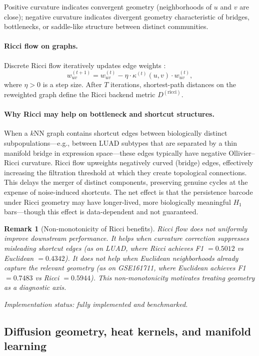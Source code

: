 \documentclass[11pt]{article}
\newtheorem{remark}[theorem]{Remark}
\begin{document}
Positive curvature indicates convergent geometry (neighborhoods of $u$ and $v$ are close); negative curvature indicates divergent geometry characteristic of bridges, bottlenecks, or saddle-like structure between distinct communities.

\paragraph{Ricci flow on graphs.}
Discrete Ricci flow iteratively updates edge weights \cite{ni2019community}:
\[
w_{uv}^{(t+1)} = w_{uv}^{(t)} - \eta \cdot \kappa^{(t)}(u,v) \cdot w_{uv}^{(t)},
\]
where $\eta > 0$ is a step size.
After $T$ iterations, shortest-path distances on the reweighted graph define the Ricci backend metric $D^{(\text{ricci})}$.

\paragraph{Why Ricci may help on bottleneck and shortcut structures.}
When a $k$NN graph contains shortcut edges between biologically distinct subpopulations---e.g., between LUAD subtypes that are separated by a thin manifold bridge in expression space---these edges typically have negative Ollivier--Ricci curvature.
Ricci flow upweights negatively curved (bridge) edges, effectively increasing the filtration threshold at which they create topological connections.
This delays the merger of distinct components, preserving genuine cycles at the expense of noise-induced shortcuts.
The net effect is that the persistence barcode under Ricci geometry may have longer-lived, more biologically meaningful $H_1$ bars---though this effect is data-dependent and not guaranteed.

\begin{remark}[Non-monotonicity of Ricci benefits]\label{rem:ricci_nonmono}
Ricci flow does not uniformly improve downstream performance.
It helps when curvature correction suppresses misleading shortcut edges (as on LUAD, where Ricci achieves F1 $= 0.5012$ vs Euclidean $= 0.4342$).
It does not help when Euclidean neighborhoods already capture the relevant geometry (as on GSE161711, where Euclidean achieves F1 $= 0.7483$ vs Ricci $= 0.5944$).
This non-monotonicity motivates treating geometry as a diagnostic axis.
\end{remark}

\emph{Implementation status: fully implemented and benchmarked.}

\subsection{Diffusion geometry, heat kernels, and manifold learning}
\label{sec:diffusion}
\end{document}

